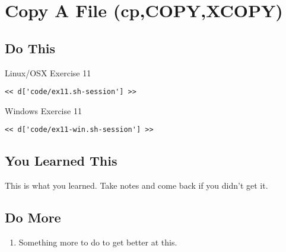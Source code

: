 \chapter{Copy A File (cp,COPY,XCOPY)}

\section{Do This}

\begin{code}{Linux/OSX Exercise 11}
\begin{Verbatim}
<< d['code/ex11.sh-session'] >>
\end{Verbatim}
\end{code}

\begin{code}{Windows Exercise 11}
\begin{Verbatim}
<< d['code/ex11-win.sh-session'] >>
\end{Verbatim}
\end{code}

\section{You Learned This}

This is what you learned.  Take notes and come back if you didn't get it.

\section{Do More}

\begin{enumerate}
\item Something more to do to get better at this.
\end{enumerate}

